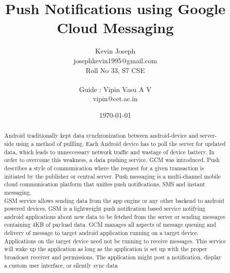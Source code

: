 \documentclass[a4paper,10pt]{article}
\title{\Huge {\textbf {Push Notifications using Google Cloud Messaging}}}
\author{
	\Large { Kevin Joseph } \\
	josephkevin1995@gmail.com \\
	\small Roll No 33, S7 CSE \\
	\\
	\Large {Guide : Vipin Vasu A V}\\
	vipin@cet.ac.in
}
\date{\today}
\begin{document}
	\maketitle
	\nocite{*}

	\renewcommand{\abstractname}{\Large Abstract}
	\begin{abstract}
		Android traditionally kept data synchronization between android-device and server-side using a method of pullling. Each 
		Android device has to poll the server for updated data, which leads to unneccessary network traffic
		and wastage of device battery. In order to overcome this weakness, a data pushing service, GCM was introduced.
		Push describes a style of communication where the request for a given transaction is initiated by the publisher
		or central server. Push messaging is a multi-channel mobile cloud communication platform that unifies push
		notifications, SMS and instant messaging.\\ GSM service allows sending data from the app engine or 
		any other backend to android powered devices. GSM is a lightweight push notification based service notifying
		android applications about new data to be fetched from the server or sending messages containing 4KB
		of payload data. GCM manages all aspects of message queuing and delivery of message to target android
		application running on a target device. Applications on the target device need not be running to receive
		messages. This service will wake up the application as long as the application is set up with the proper broadcast 
		receiver and permissions. The application might post a
		notification, display a custom user interface,
		or silently sync data
	\end{abstract}

	

\end{document}
